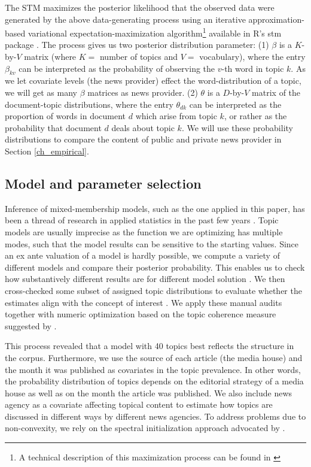 \documentclass[12pt,a4paper,notitlepage]{article}
\begin{document}
The STM maximizes the posterior likelihood that the observed data were generated by the above data-generating process using an iterative approximation-based variational expectation-maximization algorithm\footnote{A technical description of this maximization process can be found in \citet{roberts_model_2016}} available in R's stm package \citep{roberts_stm:_2016}. The process gives us two posterior distribution parameter: (1) $\beta$ is a $K$-by-$V$ matrix (where $K=$ number of topics and $V=$ vocabulary), where the entry $\beta_{kv}$ can be interpreted as the probability of observing the $v$-th word in topic $k$. As we let covariate levels (the news provider) effect the word-distribution of a topic, we will get as many $\beta$ matrices as news provider. (2) $\theta$ is a $D$-by-$V$ matrix of the document-topic distributions, where the entry $\theta_{dk}$ can be interpreted as the proportion of words in document $d$ which arise from topic $k$, or rather as the probability that document $d$ deals about topic $k$. We will use these probability distributions to compare the content of public and private news provider in Section \ref{ch_empirical}.


\subsection{Model and parameter selection}

Inference of mixed-membership models, such as the one applied in this paper, has been a thread of research in applied statistics in the past few years \citep{blei_latent_2003} \citep{erosheva_mixed-membership_2004} \citep{braun_variational_2010}. Topic models are usually imprecise as the function we are optimizing has multiple modes, such that the model results can be sensitive to the starting values. Since an ex ante valuation of a model is hardly possible, we compute a variety of different models and compare their posterior probability. This enables us to check how substantively different results are for different model solution \citep{roberts_navigating_2016}. We then cross-checked some subset of assigned topic distributions to evaluate whether the estimates align with the concept of interest \citep{gentzkow_text_2017}. We apply these manual audits together with numeric optimization based on the topic coherence measure suggested by \citet{mimno_optimizing_2011}. 

This process revealed that a model with 40 topics best reflects the structure in the corpus. Furthermore, we use the source of each article (the media house) and the month it was published as covariates in the topic prevalence. In other words, the probability distribution of topics depends on the editorial strategy of a media house as well as on the month the article was published. We also include news agency as a covariate affecting topical content to estimate how topics are discussed in different ways by different news agencies. To address problems due to non-convexity, we rely on the spectral initialization approach advocated by \citet{roberts_navigating_2016}. 
\end{document}
